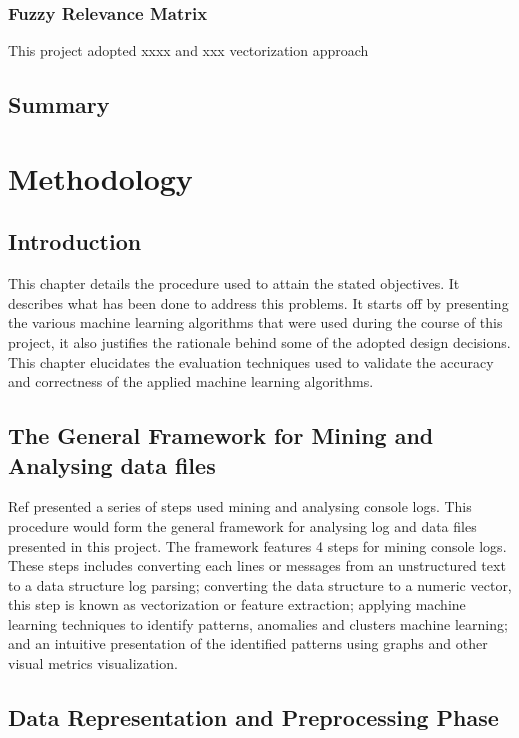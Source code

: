 \documentclass[12pt, letterpaper, titlepage]{report}
\begin{document}
\subsection{Fuzzy Relevance Matrix}

This project adopted  xxxx and xxx vectorization approach 



\section{Summary}



\newpage
\chapter{\textbf{Methodology}}

\section{Introduction}
This chapter details the procedure used to attain the stated objectives. It describes what has been done to address this problems. It starts off by presenting the various machine learning algorithms that were used during the course of this project, it also justifies the rationale behind some of the adopted design decisions. This chapter elucidates the evaluation techniques used to validate the accuracy and correctness of the applied machine learning algorithms.

\section{The General Framework for Mining and Analysing data files}
Ref presented a series of steps used mining and analysing console logs. This procedure would form the general framework for analysing log and data files presented in this project. The framework features 4 steps for mining console logs. These steps includes converting each lines or messages from an unstructured text to a data structure log parsing; converting the data structure to a numeric vector, this step is known as vectorization or feature extraction; applying machine learning techniques to identify patterns, anomalies and clusters machine learning; and an intuitive presentation of the identified patterns using graphs and other visual metrics visualization.


\section{Data Representation and Preprocessing Phase}
\end{document}
